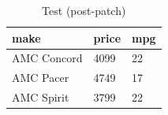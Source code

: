 \begin{table}[tbp] \centering
{}

\caption{Test (post-patch)}
\begin{tabularx}{\linewidth}{@{}lCC@{}}

\toprule
{make}&{price}&{mpg} \tabularnewline
\midrule \addlinespace[\belowrulesep]
AMC Concord&4099&22 \tabularnewline
AMC Pacer&4749&17 \tabularnewline
AMC Spirit&3799&22 \tabularnewline
\bottomrule 

\end{tabularx}
\end{table}
